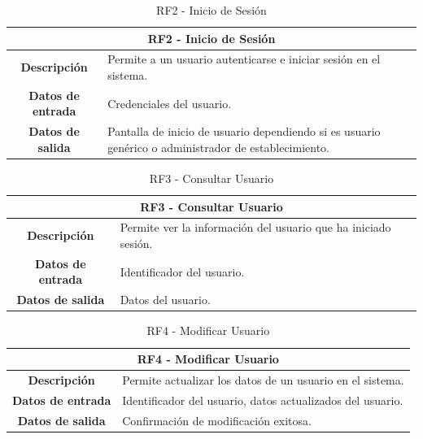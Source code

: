 \begin{table}[H]
    \centering
    \begin{tabular}{|c|p{10cm}|}
        \hline
        \multicolumn{2}{|c|}{\textbf{RF2 - Inicio de Sesión}}                                                                            \\
        \hline
        \textbf{Descripción}      & Permite a un usuario autenticarse e iniciar sesión en el sistema.                                    \\
        \hline
        \textbf{Datos de entrada} & Credenciales del usuario.                                                                            \\
        \hline
        \textbf{Datos de salida}  & Pantalla de inicio de usuario dependiendo si es usuario genérico o administrador de establecimiento. \\
        \hline
    \end{tabular}
    \caption{RF2 - Inicio de Sesión}
\end{table}

\begin{table}[H]
    \centering
    \begin{tabular}{|c|p{10cm}|}
        \hline
        \multicolumn{2}{|c|}{\textbf{RF3 - Consultar Usuario}}                                     \\
        \hline
        \textbf{Descripción}      & Permite ver la información del usuario que ha iniciado sesión. \\
        \hline
        \textbf{Datos de entrada} & Identificador del usuario.                                     \\
        \hline
        \textbf{Datos de salida}  & Datos del usuario.                                             \\
        \hline
    \end{tabular}
    \caption{RF3 - Consultar Usuario}
\end{table}

\begin{table}[H]
    \centering
    \begin{tabular}{|c|p{10cm}|}
        \hline
        \multicolumn{2}{|c|}{\textbf{RF4 - Modificar Usuario}}                                 \\
        \hline
        \textbf{Descripción}      & Permite actualizar los datos de un usuario en el sistema.  \\
        \hline
        \textbf{Datos de entrada} & Identificador del usuario, datos actualizados del usuario. \\
        \hline
        \textbf{Datos de salida}  & Confirmación de modificación exitosa.                      \\
        \hline
    \end{tabular}
    \caption{RF4 - Modificar Usuario}
\end{table}

